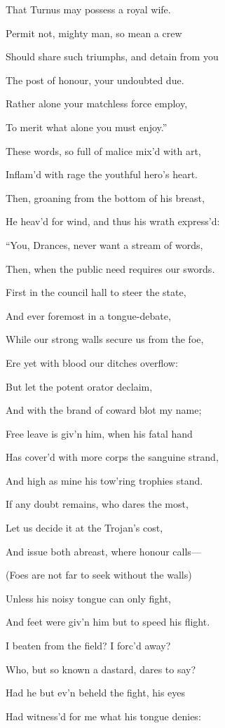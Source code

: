 That Turnus may possess a royal wife.

Permit not, mighty man, so mean a crew

Should share such triumphs, and detain from you

The post of honour, your undoubted due.

Rather alone your matchless force employ,

To merit what alone you must enjoy.”

These words, so full of malice mix’d with art,

Inflam’d with rage the youthful hero’s heart.

Then, groaning from the bottom of his breast,

He heav’d for wind, and thus his wrath express’d:

“You, Drances, never want a stream of words,

Then, when the public need requires our swords.

First in the council hall to steer the state,

And ever foremost in a tongue-debate,

While our strong walls secure us from the foe,

Ere yet with blood our ditches overflow:

But let the potent orator declaim,

And with the brand of coward blot my name;

Free leave is giv’n him, when his fatal hand

Has cover’d with more corps the sanguine strand,

And high as mine his tow’ring trophies stand.

If any doubt remains, who dares the most,

Let us decide it at the Trojan’s cost,

And issue both abreast, where honour calls—

(Foes are not far to seek without the walls)

Unless his noisy tongue can only fight,

And feet were giv’n him but to speed his flight.

I beaten from the field? I forc’d away?

Who, but so known a dastard, dares to say?

Had he but ev’n beheld the fight, his eyes

Had witness’d for me what his tongue denies:

